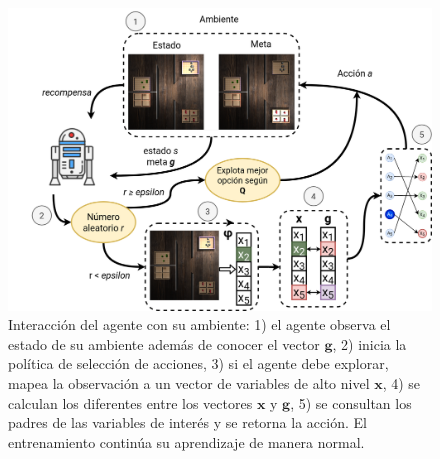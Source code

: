  \begin{figure}
     \centering
     \includegraphics[scale=0.25]{Chapter4/Figs/example_method.png}
     \caption{Interacción del agente con su ambiente: 1) el agente observa el estado de su ambiente además de conocer el vector $\mathbf{g}$, 2) inicia
     la política de selección de acciones, 3) si el agente debe explorar, mapea la observación a un vector de variables de alto nivel $\mathbf{x}$, 4) se calculan los diferentes entre los vectores $\mathbf{x}$ y $\mathbf{g}$, 5) se consultan los padres de las variables de interés y se retorna la acción. El entrenamiento continúa su aprendizaje de manera normal.}
     \label{fig:example-switches}
 \end{figure}